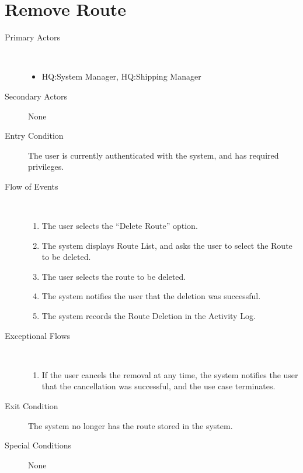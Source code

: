 \documentclass[a4paper,10pt]{report}
\begin{document}
\section{Remove Route}
\begin{description}
\item[Primary Actors] \
  \begin{itemize}
  \item HQ:System Manager, HQ:Shipping Manager
  \end{itemize}
\item[Secondary Actors] None
\item[Entry Condition]
  The user is currently authenticated with the system, and has required privileges.
\item[Flow of Events] \
  \begin{enumerate}
  \item The user selects the ``Delete Route'' option.
  \item The system displays Route List, and asks the user to select the Route to be deleted.
  \item The user selects the route to be deleted.
  \item The system notifies the user that the deletion was successful.
    \item The system records the Route Deletion in the Activity Log.
  \end{enumerate}
\item[Exceptional Flows] \
  \begin{enumerate}
  \item If the user cancels the removal at any time, the system notifies the user that the cancellation was successful, and the use case terminates.
  \end{enumerate}
\item[Exit Condition]
  The system no longer has the route stored in the system.
\item[Special Conditions] None
\end{description}
\end{document}
